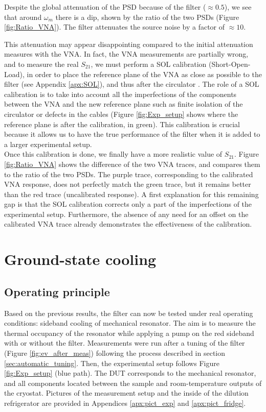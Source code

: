 \documentclass[11pt,a4pape,longbibliography]{article}
\begin{document}
Despite the global attenuation of the PSD because of the filter ($\approx\num{0.5}$), we see that around $\omega_m$ there is a dip, shown by the ratio of the two PSDs (Figure \ref{fig:Ratio_VNA}). The filter attenuates the source noise by a factor of $\approx 10$.

This attenuation may appear disappointing compared to the initial attenuation measures with the VNA. In fact, the VNA measurements are partially wrong, and to measure the real $S_{21}$, we must perform a SOL calibration (Short-Open-Load), in order to place the reference plane of the VNA as close as possible to the filter (see Appendix \ref{apx:SOL}), and thus after the circulator \cite{rytting_network_nodate}. The role of a SOL calibration is to take into account all the imperfections of the components between the VNA and the new reference plane such as finite isolation of the circulator or defects in the cables (Figure \ref{fig:Exp_setup} shows where the reference plane is after the calibration, in green). This calibration is crucial because it allows us to have the true performance of the filter when it is added to a larger experimental setup.\\

Once this calibration is done, we finally have a more realistic value of $S_{21}$. Figure \ref{fig:Ratio_VNA} shows the difference of the two VNA traces, and compares them to the ratio of the two PSDs. The purple trace, corresponding to the calibrated VNA response, does not perfectly match the green trace, but it remains better than the red trace (uncalibrated response). A first explanation for this remaining gap is that the SOL calibration corrects only a part of the imperfections of the experimental setup. Furthermore, the absence of any need for an offset on the calibrated VNA trace already demonstrates the effectiveness of the calibration.


\section{Ground-state cooling}
\label{sec:GScooling}

\subsection{Operating principle}

Based on the previous results, the filter can now be tested under real operating conditions: sideband cooling of mechanical resonator. The aim is to measure the thermal occupancy of the resonator while applying a pump on the red sideband with or without the filter.  Measurements were run after a tuning of the filter (Figure \ref{fig:ev_after_meas}) following the process described in section \ref{sec:automatic_tuning}. Then, the experimental setup follows Figure \ref{fig:Exp_setup} (blue path). The DUT corresponds to the mechanical resonator, and all components located between the sample and room-temperature outputs of the cryostat. Pictures of the measurement setup and the inside of the dilution refrigerator are provided in Appendices \ref{apx:pict_exp} and \ref{apx:pict_fridge}.
\end{document}

